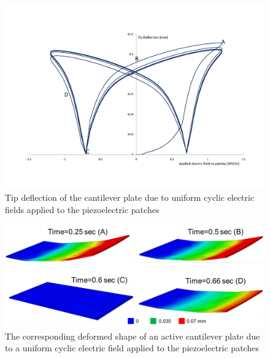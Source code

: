 \begin{figure}
\centering
\includegraphics[width=5.0in]{./chap_2_pol_sw/figures/tipdeflectioncompositeactivebeam.pdf}
\caption{Tip deflection of the cantilever plate due to uniform cyclic electric fields applied to the piezoelectric patches}
\label{fig:tipdeflectioncompositeactivebeam}
\end{figure}
 
\begin{figure}
\centering
\includegraphics[width=5.0in]{./chap_2_pol_sw/figures/Figure_13_deformed_shape_active_cantilever.png}
\caption{The corresponding deformed shape of an active cantilever plate due to a uniform cyclic electric field applied to the piezoelectric patches}
\label{fig:Figure_13_deformed_shape_active_cantilever}
\end{figure}

